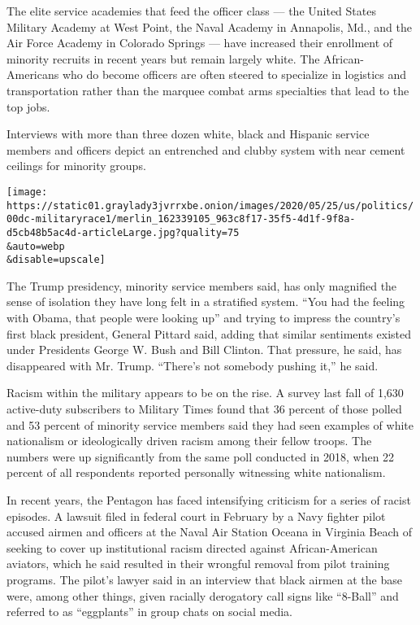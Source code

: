 The elite service academies that feed the officer class --- the United
States Military Academy at West Point, the Naval Academy in Annapolis,
Md., and the Air Force Academy in Colorado Springs --- have increased
their enrollment of minority recruits in recent years but remain largely
white. The African-Americans who do become officers are often steered to
specialize in logistics and transportation rather than the marquee
combat arms specialties that lead to the top jobs.

Interviews with more than three dozen white, black and Hispanic service
members and officers depict an entrenched and clubby system with near
cement ceilings for minority groups.

\texttt{[image: https://static01.graylady3jvrrxbe.onion/images/2020/05/25/us/politics/00dc-militaryrace1/merlin\_162339105\_963c8f17-35f5-4d1f-9f8a-d5cb48b5ac4d-articleLarge.jpg?quality=75\\\&auto=webp\\\&disable=upscale]}

The Trump presidency, minority service members said, has only magnified
the sense of isolation they have long felt in a stratified system. ``You
had the feeling with Obama, that people were looking up'' and trying to
impress the country's first black president, General Pittard said,
adding that similar sentiments existed under Presidents George W. Bush
and Bill Clinton. That pressure, he said, has disappeared with Mr.
Trump. ``There's not somebody pushing it,'' he said.

Racism within the military appears to be on the rise. A survey last fall
of 1,630 active-duty subscribers to Military Times found that 36 percent
of those polled and 53 percent of minority service members said they had
seen examples of white nationalism or ideologically driven racism among
their fellow troops. The numbers were up significantly from the same
poll conducted in 2018, when 22 percent of all respondents reported
personally witnessing white nationalism.

In recent years, the Pentagon has faced intensifying criticism for a
series of racist episodes. A lawsuit filed in federal court in February
by a Navy fighter pilot accused airmen and officers at the Naval Air
Station Oceana in Virginia Beach of seeking to cover up institutional
racism directed against African-American aviators, which he said
resulted in their wrongful removal from pilot training programs. The
pilot's lawyer said in an interview that black airmen at the base were,
among other things, given racially derogatory call signs like ``8-Ball''
and referred to as ``eggplants'' in group chats on social media.

